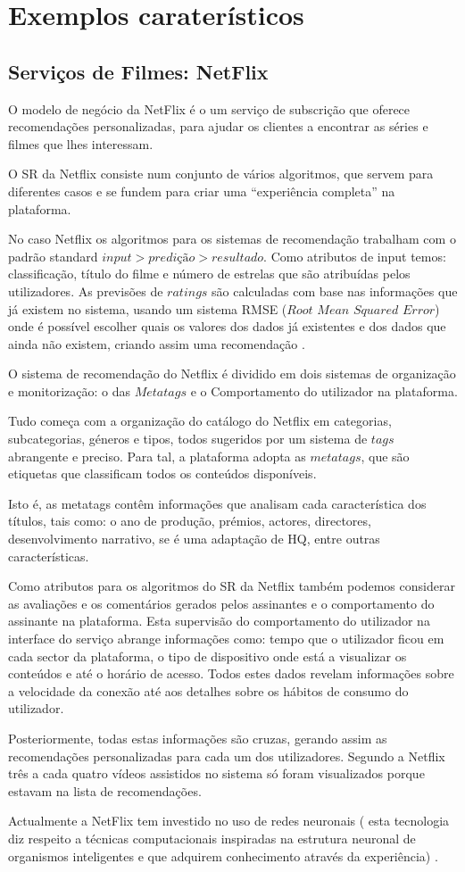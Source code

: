 \section{Exemplos caraterísticos}
\subsection{ Serviços de Filmes: NetFlix}
\par O modelo de negócio da NetFlix é o um serviço de subscrição que oferece recomendações personalizadas, para ajudar os clientes a encontrar as séries e filmes que lhes interessam.
\par O SR da Netflix consiste num conjunto de vários algoritmos, que servem para diferentes casos e se fundem para criar uma “experiência completa” na plataforma.
\par No caso Netflix os algoritmos para os sistemas de recomendação trabalham com o padrão standard $input> predição> resultado$. Como atributos de input temos: classificação, título do filme e número de estrelas que são atribuídas pelos utilizadores. As previsões de $ratings$ são calculadas com base nas informações que já existem no sistema, usando um sistema RMSE ($Root$ $Mean$ $Squared$ $Error$) onde é possível escolher quais os valores dos dados já existentes e dos dados que ainda não existem, criando assim uma recomendação \cite{net}.
\par O sistema de recomendação do Netflix é dividido em dois sistemas de organização e monitorização: o das $Metatags$ e o Comportamento do utilizador na plataforma. 
\par Tudo começa com a organização do catálogo do Netflix em categorias, subcategorias, géneros e tipos, todos sugeridos por um sistema de $tags$ abrangente e preciso. Para tal, a plataforma adopta as $metatags$, que são etiquetas que classificam todos os conteúdos disponíveis. \par Isto é, as metatags contêm informações que analisam cada característica dos títulos, tais como: o ano de produção, prémios, actores, directores, desenvolvimento narrativo, se é uma adaptação de HQ, entre outras características. 
\par Como atributos para os algoritmos do SR da Netflix também podemos considerar as avaliações e os comentários gerados pelos assinantes e o comportamento do assinante na plataforma. Esta supervisão do comportamento do utilizador na interface do serviço abrange informações como: tempo que o utilizador ficou em cada sector da plataforma, o tipo de dispositivo onde está a visualizar os conteúdos e até o horário de acesso. Todos estes dados revelam informações sobre a velocidade da conexão até aos detalhes sobre os hábitos de consumo do utilizador. \par Posteriormente, todas estas informações são cruzas, gerando assim as recomendações personalizadas para cada um dos utilizadores. Segundo a Netflix três a cada quatro vídeos assistidos no sistema só foram visualizados porque estavam na lista de recomendações. 
\par Actualmente a NetFlix tem
investido no uso de redes neuronais ( esta tecnologia diz respeito a
técnicas computacionais inspiradas na estrutura neuronal de organismos inteligentes e que adquirem conhecimento através da experiência) \cite{net1}.





